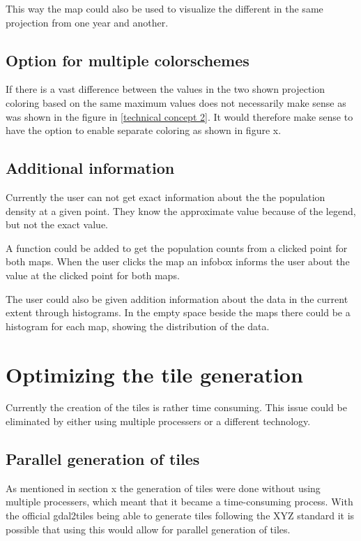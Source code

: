 This way the map could also be used to visualize the different in the same projection from one year and another.
\subsection{Option for multiple colorschemes}
If there is a vast difference between the values in the two shown projection coloring based on the same maximum values does not necessarily make sense as was shown in the figure in \ref{technical concept 2}. It would therefore make sense to have the option to enable separate coloring as shown in figure x. 

\subsection{Additional information}

Currently the user can not get exact information about the the population density at a given point. They know the approximate value because of the legend, but not the exact value. 

A function could be added to get the population counts from a clicked point for both maps. When the user clicks the map an infobox informs the user about the value at the clicked point for both maps. 

The user could also be given addition information about the data in the current extent through histograms. In the empty space beside the maps there could be a histogram for each map, showing the distribution of the data.

\section{Optimizing the tile generation}

Currently the creation of the tiles is rather time consuming. This issue could be eliminated by either using multiple processers or a different technology.

\subsection{Parallel generation of tiles}
As mentioned in section x the generation of tiles were done without using multiple processers, which meant that it became a time-consuming process. With the official gdal2tiles being able to generate tiles following the XYZ standard it is possible that using this would allow for parallel generation of tiles. 

